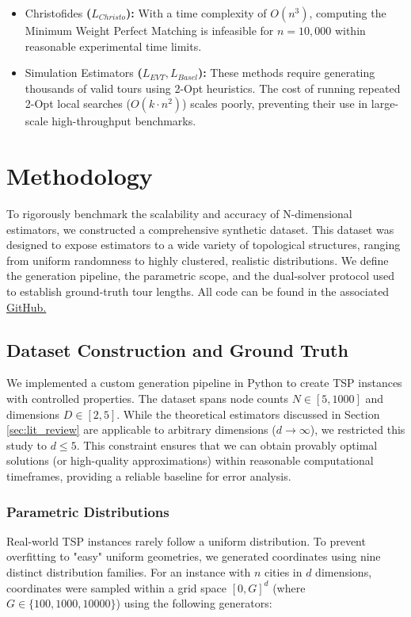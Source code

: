 \documentclass{article}
\begin{document}
\begin{itemize}
    \item Christofides\textbf{ ($L_{Christo}$):} With a time complexity of $O(n^3)$, computing the Minimum Weight Perfect Matching is infeasible for $n=10,000$ within reasonable experimental time limits.
    \item Simulation Estimators\textbf{ ($L_{EVT}, L_{Basel}$):} These methods require generating thousands of valid tours using 2-Opt heuristics. The cost of running repeated 2-Opt local searches ($O(k \cdot n^2)$) scales poorly, preventing their use in large-scale high-throughput benchmarks.
\end{itemize}

\section{Methodology}
\label{sec:methodology}

To rigorously benchmark the scalability and accuracy of N-dimensional estimators, we constructed a comprehensive synthetic dataset. This dataset was designed to expose estimators to a wide variety of topological structures, ranging from uniform randomness to highly clustered, realistic distributions. We define the generation pipeline, the parametric scope, and the dual-solver protocol used to establish ground-truth tour lengths. All code can be found in the associated \href{https://github.com/sfeldmanMIG25/Area-and-Distribution-Free-Estimators-for-TSP}{GitHub.}

\subsection{Dataset Construction and Ground Truth}

We implemented a custom generation pipeline in Python to create TSP instances with controlled properties. The dataset spans node counts $N \in [5, 1000]$ and dimensions $D \in [2, 5]$. While the theoretical estimators discussed in Section \ref{sec:lit_review} are applicable to arbitrary dimensions ($d \to \infty$), we restricted this study to $d \le 5$. This constraint ensures that we can obtain provably optimal solutions (or high-quality approximations) within reasonable computational timeframes, providing a reliable baseline for error analysis.

\subsubsection{Parametric Distributions}
Real-world TSP instances rarely follow a uniform distribution. To prevent overfitting to "easy" uniform geometries, we generated coordinates using nine distinct distribution families. For an instance with $n$ cities in $d$ dimensions, coordinates were sampled within a grid space $[0, G]^d$ (where $G \in \{100, 1000, 10000\}$) using the following generators:
\end{document}
